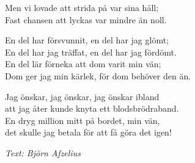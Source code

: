 Men vi lovade att strida på var sina håll;\\
Fast chansen att lyckas var mindre än noll.\par
\vspace{10pt}
En del har försvunnit, en del har jag glömt;\\
En del har jag träffat, en del har jag fördömt.\\
En del lär förneka att dom varit min vän;\\
Dom ger jag min kärlek, för dom behöver den än.\par
\vspace{10pt}
Jag önskar, jag önskar, jag önskar ibland\\
att jag åter kunde knyta ett blodsbrödraband.\\
En dryg million mitt på bordet, min vän,\\
det skulle jag betala för att få göra det igen!\par
\vspace{10pt}
{\footnotesize\textit{Text: Björn Afzelius}}
